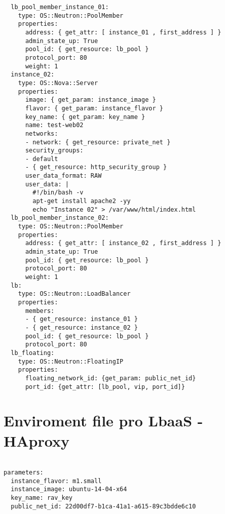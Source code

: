 \begin{lstlisting}
  lb_pool_member_instance_01:
    type: OS::Neutron::PoolMember
    properties:
      address: { get_attr: [ instance_01 , first_address ] }
      admin_state_up: True
      pool_id: { get_resource: lb_pool }
      protocol_port: 80
      weight: 1
  instance_02:
    type: OS::Nova::Server
    properties:
      image: { get_param: instance_image }
      flavor: { get_param: instance_flavor }
      key_name: { get_param: key_name }
      name: test-web02
      networks:
      - network: { get_resource: private_net }
      security_groups:
      - default
      - { get_resource: http_security_group }
      user_data_format: RAW
      user_data: |
        #!/bin/bash -v
        apt-get install apache2 -yy
        echo "Instance 02" > /var/www/html/index.html
  lb_pool_member_instance_02:
    type: OS::Neutron::PoolMember
    properties:
      address: { get_attr: [ instance_02 , first_address ] }
      admin_state_up: True
      pool_id: { get_resource: lb_pool }
      protocol_port: 80
      weight: 1
  lb:
    type: OS::Neutron::LoadBalancer
    properties:
      members:
      - { get_resource: instance_01 }
      - { get_resource: instance_02 }
      pool_id: { get_resource: lb_pool }
      protocol_port: 80
  lb_floating:
    type: OS::Neutron::FloatingIP
    properties:
      floating_network_id: {get_param: public_net_id}
      port_id: {get_attr: [lb_pool, vip, port_id]}
\end{lstlisting}

\chapter{Enviroment file pro LbaaS - HAproxy}

\begin{lstlisting}

parameters:
  instance_flavor: m1.small
  instance_image: ubuntu-14-04-x64
  key_name: rav_key
  public_net_id: 22d00df7-b1ca-41a1-a615-89c3bdde6c10

\end{lstlisting}

